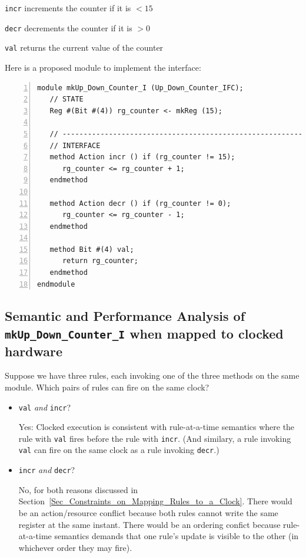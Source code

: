 \begin{tightlist}
 \item \verb|incr|  increments the counter if it is $< 15$
 \item \verb|decr|  decrements the counter if it is $> 0$
 \item \verb|val|   returns the current value of the counter
\end{tightlist}

Here is a proposed module to implement the interface:

{\footnotesize
\begin{Verbatim}[frame=single, numbers=left]
module mkUp_Down_Counter_I (Up_Down_Counter_IFC);
   // STATE
   Reg #(Bit #(4)) rg_counter <- mkReg (15);

   // ----------------------------------------------------------------
   // INTERFACE
   method Action incr () if (rg_counter != 15);
      rg_counter <= rg_counter + 1;
   endmethod

   method Action decr () if (rg_counter != 0);
      rg_counter <= rg_counter - 1;
   endmethod

   method Bit #(4) val;
      return rg_counter;
   endmethod
endmodule
\end{Verbatim}
}


\subsection{Semantic and Performance Analysis of {\tt
            mkUp\_Down\_Counter\_I} when mapped to clocked hardware}

Suppose we have three rules, each invoking one of the three methods on
the same module.  Which pairs of rules can fire on the same clock?

\begin{itemize}

 \item \verb|val| \emph{and} \verb|incr|?

       Yes: Clocked execution is consistent with rule-at-a-time
       semantics where the rule with \verb|val| fires before the rule
       with \verb|incr|.  (And similary, a rule invoking \verb|val|
       can fire on the same clock as a rule invoking \verb|decr|.)

 \item \verb|incr| \emph{and} \verb|decr|?

       No, for both reasons discussed in
       Section~\ref{Sec_Constraints_on_Mapping_Rules_to_a_Clock}.
       There would be an action/resource conflict because both rules
       cannot write the same register at the same instant.  There
       would be an ordering confict because rule-at-a-time semantics
       demands that one rule's update is visible to the other (in
       whichever order they may fire).

\end{itemize}


